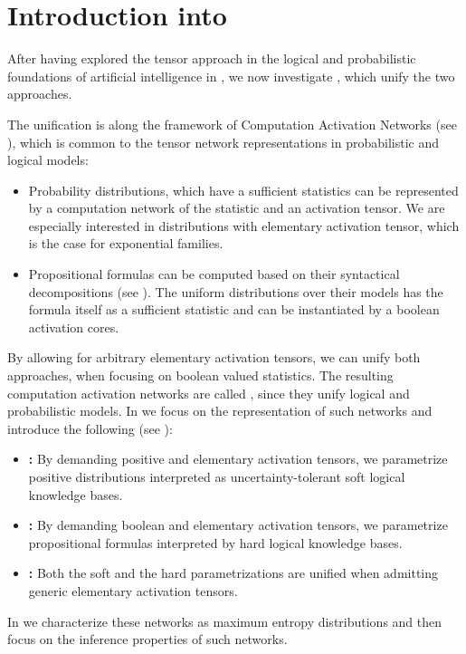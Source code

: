 \chapter{Introduction into }

After having explored the tensor approach in the logical and probabilistic foundations of artificial intelligence in , we now investigate \HybridLogicNetworks{}, which unify the two approaches.



The unification is along the framework of Computation Activation Networks (see ), which is common to the tensor network representations in probabilistic and logical models:
\begin{itemize}
    \item Probability distributions, which have a sufficient statistics can be represented by a computation network of the statistic and an activation tensor.
    We are especially interested in distributions with elementary activation tensor, which is the case for exponential families.
    \item Propositional formulas can be computed based on their syntactical decompositions (see ).
    The uniform distributions over their models has the formula itself as a sufficient statistic and can be instantiated by a boolean activation cores.
\end{itemize}
By allowing for arbitrary elementary activation tensors, we can unify both approaches, when focusing on boolean valued statistics.
The resulting computation activation networks are called \HybridLogicNetworks{}, since they unify logical and probabilistic models.
In  we focus on the representation of such networks and introduce the following (see ):
\begin{itemize}
    \item \textbf{\MarkovLogicNetworks{}:} By demanding positive and elementary activation tensors, we parametrize positive distributions interpreted as uncertainty-tolerant soft logical knowledge bases.
    \item \textbf{\HardLogicNetworks{}:} By demanding boolean and elementary activation tensors, we parametrize propositional formulas interpreted by hard logical knowledge bases.
    \item \textbf{\HybridLogicNetworks{}:} Both the soft and the hard parametrizations are unified when admitting generic elementary activation tensors.
\end{itemize}
In  we characterize these networks as maximum entropy distributions and then focus on the inference properties of such networks.

